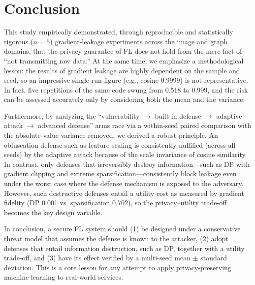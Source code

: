 \documentclass[conference]{IEEEtran}
\begin{document}
\section{Conclusion}
This study empirically demonstrated, through reproducible and statistically
rigorous ($n{=}5$) gradient-leakage experiments across the image and graph
domains, that the privacy guarantee of FL does not hold from the mere fact of
``not transmitting raw data.'' At the same time, we emphasize a methodological
lesson: the results of gradient leakage are highly dependent on the sample and
seed, so an impressive single-run figure (e.g., cosine 0.9999) is not
representative. In fact, five repetitions of the same code swung from 0.518 to
0.999, and the risk can be assessed accurately only by considering both the mean
and the variance.

Furthermore, by analyzing the ``vulnerability $\rightarrow$ built-in defense
$\rightarrow$ adaptive attack $\rightarrow$ advanced defense'' arms race via a
within-seed paired comparison with the absolute-value variance removed, we derived
a robust principle. An obfuscation defense such as feature scaling is
consistently nullified (across all seeds) by the adaptive attack because of the
scale invariance of cosine similarity. In contrast, only defenses that
irreversibly destroy information---such as DP with gradient clipping and extreme
sparsification---consistently block leakage even under the worst case where the
defense mechanism is exposed to the adversary. However, such destructive defenses
entail a utility cost as measured by gradient fidelity (DP 0.001 vs.
sparsification 0.702), so the privacy--utility trade-off becomes the key design
variable.

In conclusion, a secure FL system should (1) be designed under a conservative
threat model that assumes the defense is known to the attacker, (2) adopt
defenses that entail information destruction, such as DP, together with a utility
trade-off, and (3) have its effect verified by a multi-seed mean $\pm$ standard
deviation. This is a core lesson for any attempt to apply privacy-preserving
machine learning to real-world services.
\end{document}
